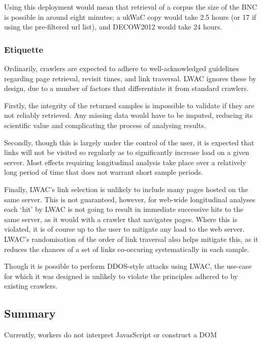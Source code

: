 Using this deployment would mean that retrieval of a corpus the size of the BNC is possible in around eight minutes; a ukWaC copy would take 2.5 hours (or 17 if using the pre-filtered url list), and DECOW2012 would take 24 hours. 





\subsubsection{Etiquette}
Ordinarily, crawlers are expected to adhere to well-acknowledged guidelines regarding page retrieval, revisit times, and link traversal.  LWAC ignores these by design, due to a number of factors that differentiate it from standard crawlers.

Firstly, the integrity of the returned samples is impossible to validate if they are not reliably retrieved.  Any missing data would have to be imputed, reducing its scientific value and complicating the process of analysing results.

Secondly, though this is largely under the control of the user, it is expected that links will not be visited so regularly as to significantly increase load on a given server.  Most effects requiring longitudinal analysis take place over a relatively long period of time that does not warrant short sample periods.

Finally, LWAC's link selection is unlikely to include many pages hosted on the same server.  This is not guaranteed, however, for web-wide longitudinal analyses each `hit' by LWAC is not going to result in immediate successive hits to the same server, as it would with a crawler that navigates pages.  Where this is violated, it is of course up to the user to mitigate any load to the web server.  LWAC's randomisation of the order of link traversal also helps mitigate this, as it reduces the chances of a set of links co-occuring systematically in each sample.

Though it is possible to perform DDOS-style attacks using LWAC, the use-case for which it was designed is unlikely to violate the principles adhered to by existing crawlers.


\subsection{Summary}

Currently, workers do not interpret JavasScript or construct a DOM

